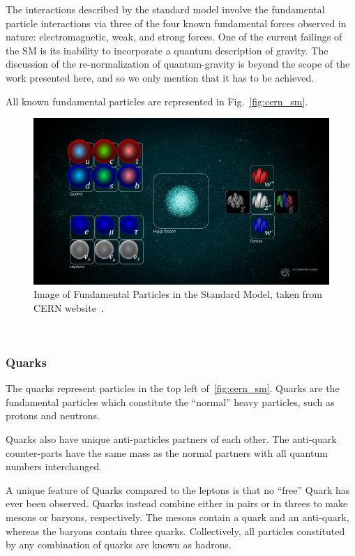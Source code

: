 The interactions described by the standard model involve the fundamental particle interactions via three of the four known fundamental forces observed in nature: electromagnetic, weak, and strong forces.
One of the current failings of the SM is its inability to incorporate a quantum description of gravity.
The discussion of the re-normalization of quantum-gravity is beyond the scope of the work presented here, and so we only mention that it has to be achieved.


All known fundamental particles are represented in Fig.~\ref{fig:cern_sm}.


\begin{figure}[]
\centering
\includegraphics[width=\textwidth]{images/STDM_higgs_and_field_D.png}
\caption{Image of Fundamental Particles in the Standard Model, taken from CERN website~\citep{dominguez_2015}.}
\end{figure}
~\label{fig:cern_sm}


\subsubsection{Quarks}

The quarks represent particles in the top left of~\ref{fig:cern_sm}.
Quarks are the fundamental particles which constitute the ``normal'' heavy particles, such as protons and neutrons.

Quarks also have unique anti-particles partners of each other.
The anti-quark counter-parts have the same mass as the normal partners with all quantum numbers interchanged.

A unique feature of Quarks compared to the leptons is that no ``free'' Quark has ever been observed.
Quarks instead combine either in pairs or in threes to make mesons or baryons, respectively.
The mesons contain a quark and an anti-quark, whereas the baryons contain three quarks.
Collectively, all particles constituted by any combination of quarks are known as hadrons.

